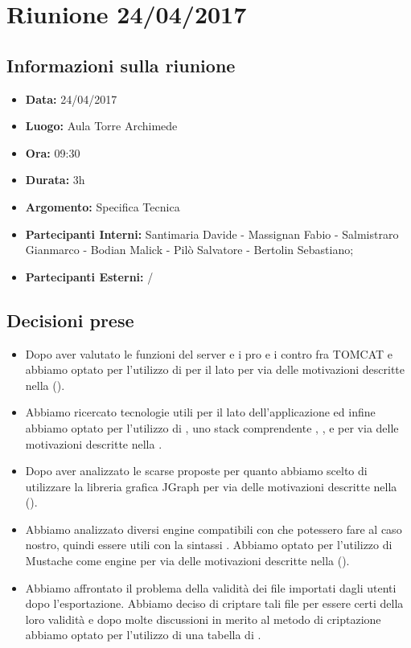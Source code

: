 \section{Riunione 24/04/2017}
  \subsection{Informazioni sulla riunione}
    \begin{itemize}
      \item \textbf{Data: }24/04/2017
      \item \textbf{Luogo: }Aula Torre Archimede
      \item \textbf{Ora: }09:30
      \item \textbf{Durata: }3h
      \item \textbf{Argomento: }Specifica Tecnica
      \item \textbf{Partecipanti Interni: }Santimaria Davide - Massignan Fabio - Salmistraro Gianmarco - Bodian Malick - Pilò Salvatore - Bertolin Sebastiano;
      \item \textbf{Partecipanti Esterni: }/
    \end{itemize}
  \subsection{Decisioni prese}
		\begin{itemize}
			\item Dopo aver valutato le funzioni del server
				e i pro e i contro fra TOMCAT e  abbiamo optato per l'utilizzo di  per il lato  per via delle motivazioni descritte nella \versioneST().
			\item Abbiamo ricercato tecnologie utili per il lato  dell'applicazione ed infine abbiamo optato
				per l'utilizzo di , uno stack comprendente , ,  e  per via delle motivazioni descritte nella \versioneST.
			\item Dopo aver analizzato le scarse  proposte  per quanto abbiamo scelto di
				utilizzare la libreria grafica JGraph per via delle motivazioni descritte nella \versioneST().
			\item Abbiamo analizzato diversi  engine compatibili con  che potessero fare al caso nostro,
				quindi essere utili con la sintassi .
				Abbiamo optato per l'utilizzo di Mustache come  engine per via delle motivazioni descritte nella \versioneST().
			\item Abbiamo affrontato il problema della validità dei file importati dagli utenti dopo l'esportazione.
				Abbiamo deciso di criptare tali file per essere certi della loro validità e dopo molte discussioni in merito al metodo di criptazione
				abbiamo optato per l'utilizzo di una tabella di .
		\end{itemize}
